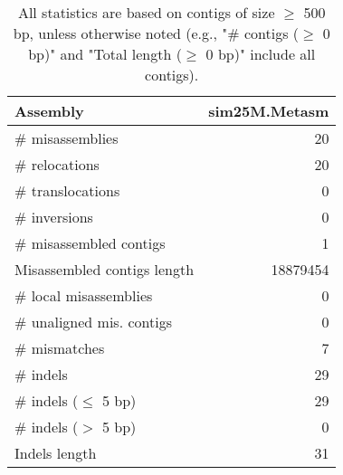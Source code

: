 \documentclass[12pt,a4paper]{article}
\begin{document}
\begin{table}[ht]
\begin{center}
\caption{All statistics are based on contigs of size $\geq$ 500 bp, unless otherwise noted (e.g., "\# contigs ($\geq$ 0 bp)" and "Total length ($\geq$ 0 bp)" include all contigs).}
\begin{tabular}{|l*{1}{|r}|}
\hline
Assembly & sim25M.Metasm \\ \hline
\# misassemblies & 20 \\ \hline
\hspace{5mm}\# relocations & 20 \\ \hline
\hspace{5mm}\# translocations & 0 \\ \hline
\hspace{5mm}\# inversions & 0 \\ \hline
\# misassembled contigs & 1 \\ \hline
Misassembled contigs length & 18879454 \\ \hline
\# local misassemblies & 0 \\ \hline
\# unaligned mis. contigs & 0 \\ \hline
\# mismatches & 7 \\ \hline
\# indels & 29 \\ \hline
\hspace{5mm}\# indels ($\leq$ 5 bp) & 29 \\ \hline
\hspace{5mm}\# indels ($>$ 5 bp) & 0 \\ \hline
Indels length & 31 \\ \hline
\end{tabular}
\end{center}
\end{table}
\end{document}
